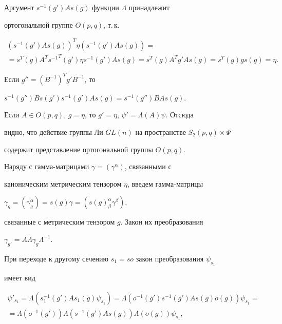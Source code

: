 Аргумент $s^{-1}(g')As(g)$ функции $\Lambda$ принадлежит


ортогональной группе $O(p,q)$, т.\,к.


\begin{multline*}


(s^{-1}(g')As(g))^T\eta (s^{-1}(g')As(g))= \\


=s^T(g)A^T{s^{-1}}^T(g')\eta s^{-1}(g')As(g)


=s^T(g)A^Tg'As(g)=s^T(g)gs(g)=\eta.


\end{multline*}


Если $g''=({B^{-1}})^Tg'B^{-1}$, то


$s^{-1}(g'')Bs(g')s^{-1}(g')As(g)= s^{-1}(g'')BAs(g)$.





Если $A\in O(p,q)$, $g=\eta$, то $g'=\eta$, $\psi'=\Lambda(A)\psi$. Отсюда 


видно, что действие группы Ли $GL(n)$ на пространстве $S_2(p,q)\times \Psi$


содержит представление ортогональной группы $O(p,q)$.





Наряду с гамма-матрицами $\gamma=(\gamma^\alpha)$, связанными с


каноническим метрическим тензором $\eta$, введем гамма-матрицы


$\gamma_g=(\gamma_g^\alpha)=s(g)\gamma=(s(g)^\alpha_\beta\gamma^\beta)$,


связанные с метрическим тензором $g$. Закон их преобразования


$\gamma_{g'}=A\Lambda\gamma_g\Lambda^{-1}$.





При переходе к другому сечению $s_1=so$ закон преобразования $\psi_{s_1}$


имеет вид


\begin{multline*}


\psi'_{s_1}=\Lambda(s_1^{-1}(g')As_1(g)\psi_{s_1})=


\Lambda(o^{-1}(g')s^{-1}(g')As(g)o(g))\psi_{s_1}= \\


=\Lambda(o^{-1}(g'))\Lambda(s^{-1}(g')As(g))\Lambda(o(g)) \psi_{s_1},


\end{multline*}


